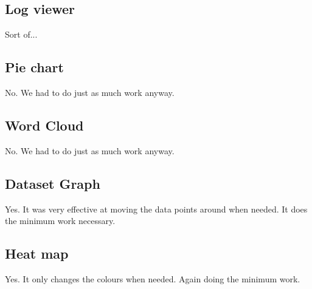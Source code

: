 \subsection{Log viewer}
Sort of...
\subsection{Pie chart}
No. We had to do just as much work anyway.
\subsection{Word Cloud}
No. We had to do just as much work anyway.
\subsection{Dataset Graph}
Yes. It was very effective at moving the data points around when needed. It does the minimum work necessary.
\subsection{Heat map}
Yes. It only changes the colours when needed. Again doing the minimum work.
